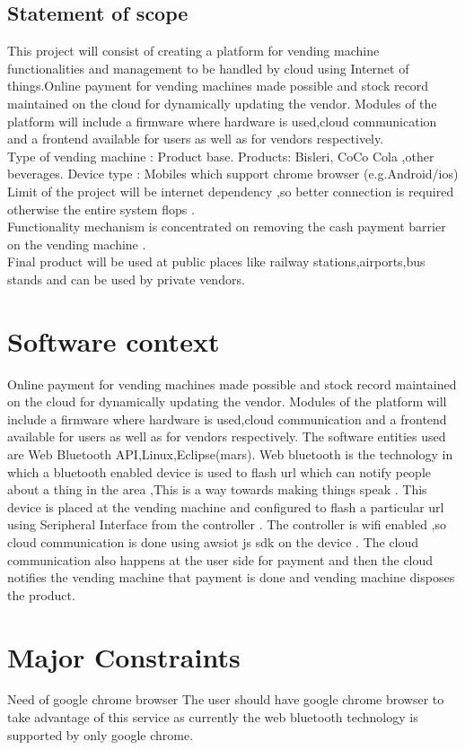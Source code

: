 \documentclass[oneside,a4paper,12pt]{report}
\begin{document}
 \subsection{Statement of scope} 
This project will consist of creating a platform for vending machine functionalities and management to be  handled by cloud using Internet of things.Online payment for vending machines made possible and stock record maintained on the cloud for dynamically updating the vendor. Modules of the platform will include a firmware where hardware is used,cloud communication and a frontend available for users as well as for vendors respectively.\\
Type of vending machine : Product base.
Products: Bisleri,  CoCo Cola ,other beverages.
Device type : Mobiles which support chrome browser (e.g.Android/ios)\\
Limit of the project will be internet dependency ,so better connection is required otherwise the entire system flops .\\
Functionality mechanism is concentrated on removing the cash payment barrier on the vending machine .\\
Final product will be used at public places like railway stations,airports,bus stands and can be used by private vendors.\\
\section{Software context} 
Online payment for vending machines made possible and stock record maintained on the cloud for dynamically updating the vendor. Modules of the platform will include a firmware where hardware is used,cloud communication and a frontend available for users as well as for vendors respectively.
The software entities used are Web Bluetooth API,Linux,Eclipse(mars).
Web bluetooth is the technology in which a bluetooth enabled device is used to flash url which can notify people about a thing in the area ,This is a way towards making things speak .
This device is placed at the vending machine and configured to flash a particular url using Seripheral Interface from the controller .
The controller is wifi enabled ,so cloud communication is done using awsiot js sdk on the device .
The cloud communication also happens at the user side for  payment and then the cloud notifies the vending machine that payment is done and vending machine disposes the product.
\section{Major Constraints}
Need of google chrome browser
The user should have google chrome browser to take advantage of this service as currently the web bluetooth technology is supported by only google chrome.
\end{document}

